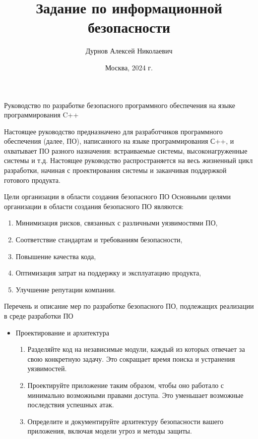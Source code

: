 \documentclass[10pt]{beamer}
\title[]{Задание по информационной безопасности}
\author{Дурнов Алексей Николаевич}
\institute[МФТИ]{
    Московский физико-технический институт\\
    Физтех-школа радиотехники и компьютерных технологий\\
}
\date{Москва, 2024 г.}
\begin{document}
\begin{frame}
    \titlepage
    \thispagestyle{empty}
\end{frame}

\begin{frame}{Руководство по разработке безопасного программного обеспечения на языке программирования C++}

    Настоящее руководство предназначено для разработчиков программного обеспечения (далее, ПО), написанного на языке программирования С++, и охватывает ПО разного назначения: встраиваемые системы, высоконагруженные системы и т.д. Настоящее руководство распространяется на весь жизненный цикл разработки, начиная с проектирования системы и заканчивая поддержкой готового продукта.

\end{frame}

\begin{frame}{Цели организации в области создания безопасного ПО}
    Основными целями организации в области создания безопасного ПО являются:

    \begin{enumerate}
        \item Минимизация рисков, связанных с различными уязвимостями ПО,
        \item Соответствие стандартам и требованиям безопасности,
        \item Повышение качества кода,
        \item Оптимизация затрат на поддержку и эксплуатацию продукта,
        \item Улучшение репутации компании.
    \end{enumerate}

\end{frame}

\begin{frame}{Перечень и описание мер по разработке безопасного ПО, подлежащих реализации в среде разработки ПО}
    \begin{itemize}
        \item Проектирование и архитектура
        \begin{enumerate}
            \item Разделяйте код на независимые модули, каждый из которых отвечает за свою конкретную задачу. Это сокращает время поиска и устранения уязвимостей.
            \item Проектируйте приложение таким образом, чтобы оно работало с минимально возможными правами доступа. Это уменьшает возможные последствия успешных атак.
            \item Определите и документируйте архитектуру безопасности вашего приложения, включая модели угроз и методы защиты.
        \end{enumerate}
    \end{itemize}
\end{frame}
\end{document}
